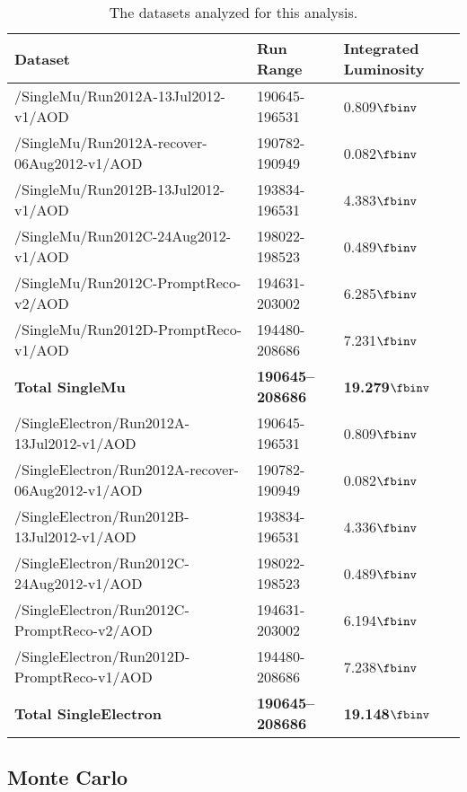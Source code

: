 \begin{table}[hbtp]\footnotesize
\centering
\begin{tabular}{l l l}
\hline
 Dataset & Run Range & Integrated Luminosity \\
\hline
/SingleMu/Run2012A-13Jul2012-v1/AOD & 190645-196531 & 0.809$\fbinv$ \\
/SingleMu/Run2012A-recover-06Aug2012-v1/AOD & 190782-190949 & 0.082$\fbinv$ \\
/SingleMu/Run2012B-13Jul2012-v1/AOD & 193834-196531 & 4.383$\fbinv$ \\
/SingleMu/Run2012C-24Aug2012-v1/AOD & 198022-198523 & 0.489$\fbinv$ \\
/SingleMu/Run2012C-PromptReco-v2/AOD & 194631-203002 & 6.285$\fbinv$ \\
/SingleMu/Run2012D-PromptReco-v1/AOD & 194480-208686 & 7.231$\fbinv$ \\
{\bf Total SingleMu} & {\bf 190645--208686} & {\bf 19.279$\fbinv$} \\
\hline
/SingleElectron/Run2012A-13Jul2012-v1/AOD & 190645-196531 & 0.809$\fbinv$ \\
/SingleElectron/Run2012A-recover-06Aug2012-v1/AOD & 190782-190949 & 0.082$\fbinv$ \\
/SingleElectron/Run2012B-13Jul2012-v1/AOD & 193834-196531 & 4.336$\fbinv$ \\
/SingleElectron/Run2012C-24Aug2012-v1/AOD & 198022-198523 & 0.489$\fbinv$ \\
/SingleElectron/Run2012C-PromptReco-v2/AOD & 194631-203002 & 6.194$\fbinv$ \\
/SingleElectron/Run2012D-PromptReco-v1/AOD & 194480-208686 & 7.238$\fbinv$\\
{\bf Total SingleElectron} & {\bf 190645--208686} & {\bf 19.148$\fbinv$} \\
\hline
\end{tabular}
\caption{The datasets analyzed for this analysis.}
\label{tab:dataSamples}
\end{table}

\subsection{Monte Carlo}

